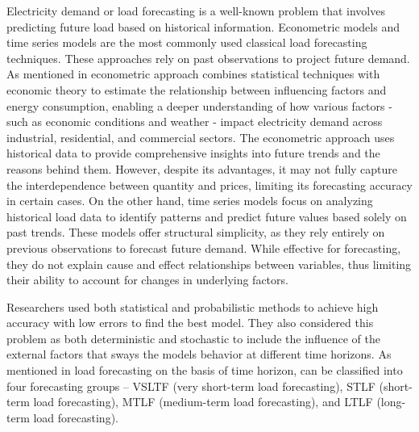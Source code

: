 \documentclass[mstat,12pt]{unswthesis}
\begin{document}
Electricity demand or load forecasting is a well-known problem that
involves predicting future load based on historical information.
Econometric models and time series models are the most commonly used
classical load forecasting techniques. These approaches rely on past
observations to project future demand. As mentioned in \cite{9812604}
econometric approach combines statistical techniques with economic
theory to estimate the relationship between influencing factors and
energy consumption, enabling a deeper understanding of how various
factors - such as economic conditions and weather - impact electricity
demand across industrial, residential, and commercial sectors. The
econometric approach uses historical data to provide comprehensive
insights into future trends and the reasons behind them. However,
despite its advantages, it may not fully capture the interdependence
between quantity and prices, limiting its forecasting accuracy in
certain cases. On the other hand, time series models focus on analyzing
historical load data to identify patterns and predict future values
based solely on past trends. These models offer structural simplicity,
as they rely entirely on previous observations to forecast future
demand. While effective for forecasting, they do not explain cause and
effect relationships between variables, thus limiting their ability to
account for changes in underlying factors.

Researchers used both statistical and probabilistic methods to achieve
high accuracy with low errors to find the best model. They also
considered this problem as both deterministic and stochastic to include
the influence of the external factors that sways the models behavior at
different time horizons. As mentioned in \cite{9812604} load forecasting
on the basis of time horizon, can be classified into four forecasting
groups -- VSLTF (very short-term load forecasting), STLF (short-term
load forecasting), MTLF (medium-term load forecasting), and LTLF
(long-term load forecasting).
\end{document}
